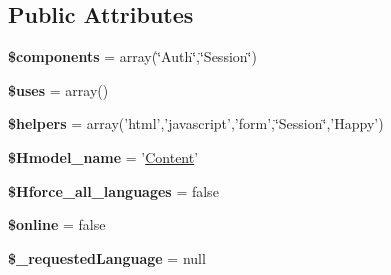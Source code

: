 \subsection*{\-Public \-Attributes}
\begin{DoxyCompactItemize}
\item 
\hypertarget{class_app_controller_a1649c9888b596557b60a06279beaf5fe}{
{\bfseries \$components} = array(\char`\"{}\-Auth\char`\"{},\char`\"{}\-Session\char`\"{})}
\label{class_app_controller_a1649c9888b596557b60a06279beaf5fe}

\item 
\hypertarget{class_app_controller_acdc4943ef51e546233a9fa724f4019ee}{
{\bfseries \$uses} = array()}
\label{class_app_controller_acdc4943ef51e546233a9fa724f4019ee}

\item 
\hypertarget{class_app_controller_a1d625be7647dafc4f218c2a320cab95b}{
{\bfseries \$helpers} = array('html','javascript','form',\char`\"{}\-Session\char`\"{},'\-Happy')}
\label{class_app_controller_a1d625be7647dafc4f218c2a320cab95b}

\item 
\hypertarget{class_app_controller_ae7d246eea37c34fa71ead8b36637bdf9}{
{\bfseries \$\-Hmodel\-\_\-name} = '\hyperlink{class_content}{\-Content}'}
\label{class_app_controller_ae7d246eea37c34fa71ead8b36637bdf9}

\item 
\hypertarget{class_app_controller_a9b4468e8b744c92dc2a128453c31349b}{
{\bfseries \$\-Hforce\-\_\-all\-\_\-languages} = false}
\label{class_app_controller_a9b4468e8b744c92dc2a128453c31349b}

\item 
\hypertarget{class_app_controller_ab189a47a78df5b8e4150b44adaa4e274}{
{\bfseries \$online} = false}
\label{class_app_controller_ab189a47a78df5b8e4150b44adaa4e274}

\item 
\hypertarget{class_app_controller_a429b64646f461eb735b402fdccd32202}{
{\bfseries \$\-\_\-requested\-Language} = null}
\label{class_app_controller_a429b64646f461eb735b402fdccd32202}

\end{DoxyCompactItemize}
